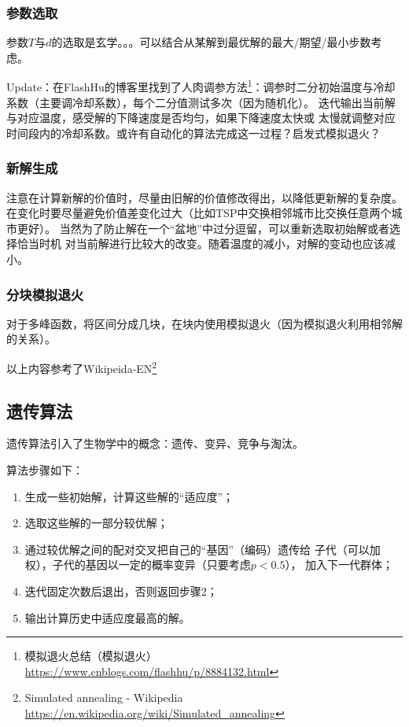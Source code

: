\subsubsection{参数选取}
参数$T$与$d$的选取是玄学。。。可以结合从某解到最优解的最大/期望/最小步数考虑。

Update：在FlashHu的博客里找到了人肉调参方法\footnote{
	模拟退火总结（模拟退火）\\
	\url{https://www.cnblogs.com/flashhu/p/8884132.html}
}：调参时二分初始温度与冷却系数（主要调冷却系数），每个二分值测试多次（因为随机化）。
迭代输出当前解与对应温度，感受解的下降速度是否均匀，如果下降速度太快或
太慢就调整对应时间段内的冷却系数。或许有自动化的算法完成这一过程？启发式模拟退火？

\subsubsection{新解生成}
注意在计算新解的价值时，尽量由旧解的价值修改得出，以降低更新解的复杂度。
在变化时要尽量避免价值差变化过大（比如TSP中交换相邻城市比交换任意两个城市更好）。
当然为了防止解在一个``盆地''中过分逗留，可以重新选取初始解或者选择恰当时机
对当前解进行比较大的改变。随着温度的减小，对解的变动也应该减小。
\subsubsection{分块模拟退火}
对于多峰函数，将区间分成几块，在块内使用模拟退火（因为模拟退火利用相邻解的关系）。

以上内容参考了Wikipeida-EN\footnote{
	Simulated annealing - Wikipedia\\
	\url{https://en.wikipedia.org/wiki/Simulated\_annealing}
}
\subsection{遗传算法}
遗传算法引入了生物学中的概念：遗传、变异、竞争与淘汰。

算法步骤如下：
\begin{enumerate}
	\item 生成一些初始解，计算这些解的``适应度''；
	\item 选取这些解的一部分较优解；
	\item 通过较优解之间的配对交叉把自己的``基因''（编码）遗传给
		  子代（可以加权），子代的基因以一定的概率变异（只要考虑$p<0.5$），
		  加入下一代群体；
	\item 迭代固定次数后退出，否则返回步骤2；
	\item 输出计算历史中适应度最高的解。
\end{enumerate}
